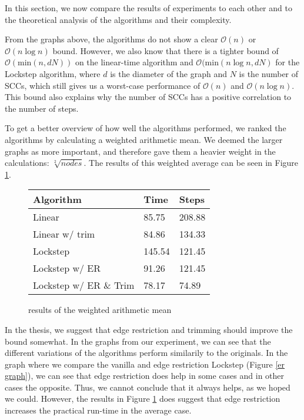 \documentclass[../master/master.tex]{subfiles}
\begin{document}
In this section, we now compare the results of experiments to each other and to the theoretical analysis of the algorithms and their complexity.

From the graphs above, the algorithms do not show a clear $\mathcal{O}(n)$ or $\mathcal{O}(n\log n)$ bound. However, we also know that there is a tighter bound of $\mathcal{O}(\text{min}(n, dN))$ on the linear-time algorithm and $\mathcal{O}(\text{min}(n\log n, dN)$ for the Lockstep algorithm, where $d$ is the diameter of the graph and $N$ is the number of SCCs, which still gives us a worst-case performance of $\mathcal{O}(n)$ and $\mathcal{O}(n\log n)$. This bound also explains why the number of SCCs has a positive correlation to the number of steps.

To get a better overview of how well the algorithms performed, we ranked the algorithms by calculating a weighted arithmetic mean. We deemed the larger graphs as more important, and therefore gave them a heavier weight in the calculations: $\sqrt[2]{nodes}$. The results of this weighted average can be seen in Figure \ref{mean}.

\begin{figure}[h]
  \centering
  \begin{tabular}{|l|l|l|}
    \hline
    Algorithm              & Time   & Steps  \\
    \hline
    Linear                 & 85.75  & 208.88 \\
    \hline
    Linear w/ trim         & 84.86  & 134.33 \\
    \hline
    Lockstep               & 145.54 & 121.45 \\
    \hline
    Lockstep w/ ER         & 91.26  & 121.45 \\
    \hline
    Lockstep w/ ER \& Trim & 78.17  & 74.89 \\
    \hline
\end{tabular}
\caption{results of the weighted arithmetic mean}\label{mean}
\end{figure}

In the thesis, we suggest that edge restriction and trimming should improve the bound somewhat. In the graphs from our experiment, we can see that the different variations of the algorithms perform similarily to the originals. In the graph where we compare the vanilla and edge restriction Lockstep (Figure \ref{er graph}), we can see that edge restriction does help in some cases and in other cases the opposite. Thus, we cannot conclude that it always helps, as we hoped we could. However, the results in Figure \ref{mean} does suggest that edge restriction increases the practical run-time in the average case. 
\end{document}
